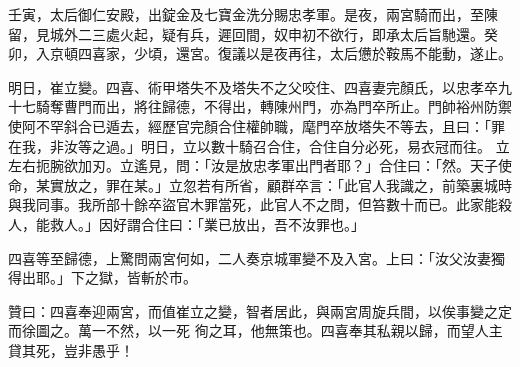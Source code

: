 \begin{pinyinscope}
 壬寅，太后御仁安殿，出錠金及七寶金洗分賜忠孝軍。是夜，兩宮騎而出，至陳留，見城外二三處火起，疑有兵，遲回間，奴申初不欲行，即承太后旨馳還。癸卯，入京頓四喜家，少頃，還宮。復議以是夜再往，太后憊於鞍馬不能動，遂止。



 明日，崔立變。四喜、術甲塔失不及塔失不之父咬住、四喜妻完顏氏，以忠孝卒九十七騎奪曹門而出，將往歸德，不得出，轉陳州門，亦為門卒所止。門帥裕州防禦使阿不罕斜合已遁去，經歷官完顏合住權帥職，麾門卒放塔失不等去，且曰：「罪在我，非汝等之過。」明日，立以數十騎召合住，合住自分必死，易衣冠而往。
 立左右扼腕欲加刃。立遙見，問：「汝是放忠孝軍出門者耶？」合住曰：「然。天子使命，某實放之，罪在某。」立忽若有所省，顧群卒言：「此官人我識之，前築裏城時與我同事。我所部十餘卒盜官木罪當死，此官人不之問，但笞數十而已。此家能殺人，能救人。」因好謂合住曰：「業已放出，吾不汝罪也。」



 四喜等至歸德，上驚問兩宮何如，二人奏京城軍變不及入宮。上曰：「汝父汝妻獨得出耶。」下之獄，皆斬於市。



 贊曰：四喜奉迎兩宮，而值崔立之變，智者居此，與兩宮周旋兵間，以俟事變之定而徐圖之。萬一不然，以一死
 徇之耳，他無策也。四喜奉其私親以歸，而望人主貸其死，豈非愚乎！



\end{pinyinscope}